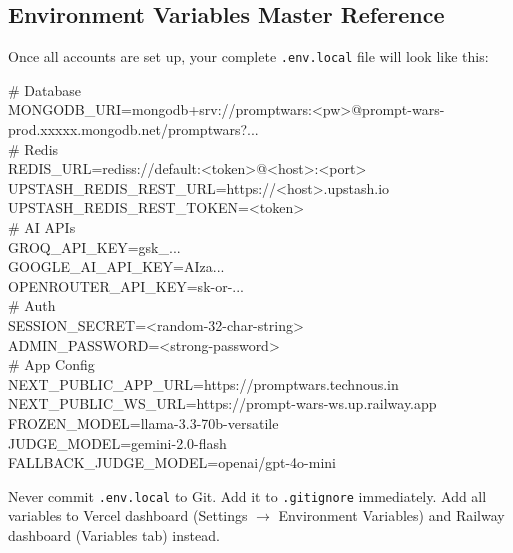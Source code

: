 \documentclass[11pt, a4paper]{article}
\begin{document}
\subsection{Environment Variables Master Reference}

Once all accounts are set up, your complete \texttt{.env.local} file will look like this:

\begin{tcolorbox}[codebox]
\small\color{white}\ttfamily
\textcolor{codegreen}{\# Database}\\
MONGODB\_URI=mongodb+srv://promptwars:<pw>@prompt-wars-prod.xxxxx.mongodb.net/promptwars?...\\
\textcolor{codegreen}{\# Redis}\\
REDIS\_URL=rediss://default:<token>@<host>:<port>\\
UPSTASH\_REDIS\_REST\_URL=https://<host>.upstash.io\\
UPSTASH\_REDIS\_REST\_TOKEN=<token>\\
\textcolor{codegreen}{\# AI APIs}\\
GROQ\_API\_KEY=gsk\_...\\
GOOGLE\_AI\_API\_KEY=AIza...\\
OPENROUTER\_API\_KEY=sk-or-...\\
\textcolor{codegreen}{\# Auth}\\
SESSION\_SECRET=<random-32-char-string>\\
ADMIN\_PASSWORD=<strong-password>\\
\textcolor{codegreen}{\# App Config}\\
NEXT\_PUBLIC\_APP\_URL=https://promptwars.technous.in\\
NEXT\_PUBLIC\_WS\_URL=https://prompt-wars-ws.up.railway.app\\
FROZEN\_MODEL=llama-3.3-70b-versatile\\
JUDGE\_MODEL=gemini-2.0-flash\\
FALLBACK\_JUDGE\_MODEL=openai/gpt-4o-mini\\
\end{tcolorbox}

\begin{tcolorbox}[alertbox, title={Security Warning}]
Never commit \texttt{.env.local} to Git. Add it to \texttt{.gitignore} immediately. Add all variables to Vercel dashboard (Settings $\to$ Environment Variables) and Railway dashboard (Variables tab) instead.
\end{tcolorbox}

\end{document}
